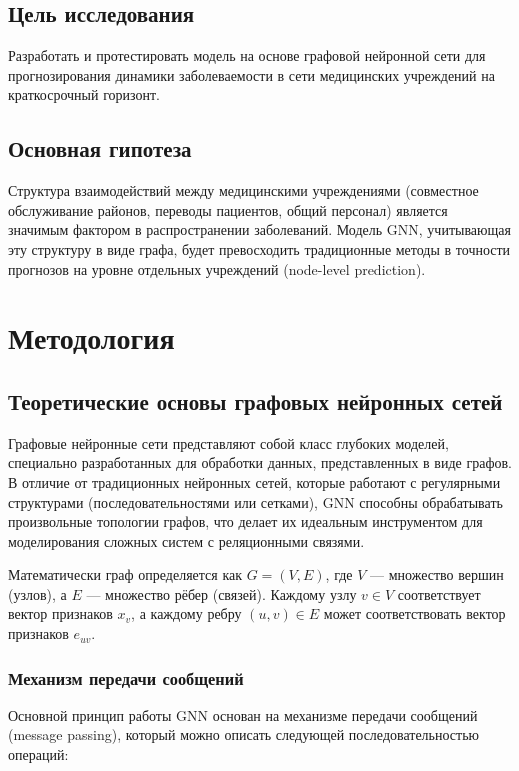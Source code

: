 \documentclass[12pt,a4paper]{article}
\begin{document}
	\subsection{Цель исследования}
	Разработать и протестировать модель на основе графовой нейронной сети для прогнозирования динамики заболеваемости в сети медицинских учреждений на краткосрочный горизонт.
	
	\subsection{Основная гипотеза}
	Структура взаимодействий между медицинскими учреждениями (совместное обслуживание районов, переводы пациентов, общий персонал) является значимым фактором в распространении заболеваний. Модель GNN, учитывающая эту структуру в виде графа, будет превосходить традиционные методы в точности прогнозов на уровне отдельных учреждений (node-level prediction).
	
	\section{Методология}
	\subsection{Теоретические основы графовых нейронных сетей}
	Графовые нейронные сети представляют собой класс глубоких моделей, специально разработанных для обработки данных, представленных в виде графов. В отличие от традиционных нейронных сетей, которые работают с регулярными структурами (последовательностями или сетками), GNN способны обрабатывать произвольные топологии графов, что делает их идеальным инструментом для моделирования сложных систем с реляционными связями.
	
	Математически граф определяется как $G = (V, E)$, где $V$ — множество вершин (узлов), а $E$ — множество рёбер (связей). Каждому узлу $v \in V$ соответствует вектор признаков $x_v$, а каждому ребру $(u, v) \in E$ может соответствовать вектор признаков $e_{uv}$.
	
	\subsubsection{Механизм передачи сообщений}
	Основной принцип работы GNN основан на механизме передачи сообщений (message passing), который можно описать следующей последовательностью операций:
	
\end{document}

